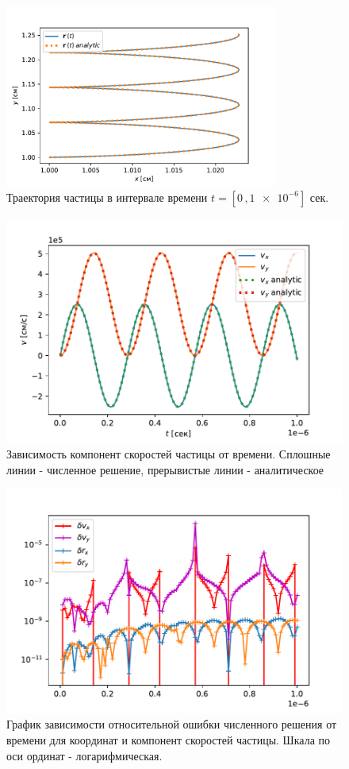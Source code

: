 \documentclass[a4paper]{article}
\begin{document}
\begin{figure}
	\centering
	\includegraphics[width=0.8\textwidth]{plotTrajectory.pdf}
	\caption{Траектория частицы в интервале времени $t = [0 \,, \num{1e-6}]$ сек.}
	\label{graph_t}
\end{figure}

\begin{figure}
	\centering
	\includegraphics[width=0.8\linewidth]{plotSpeed.pdf}
	\caption{Зависимость компонент скоростей частицы от времени. Сплошные линии - численное решение, прерывистые линии - аналитическое}
	\label{graph_s}
\end{figure}

\begin{figure}
	\centering
	\includegraphics[width=0.8\linewidth]{plotMistake.pdf}
	\caption{График зависимости относительной ошибки численного решения от времени для координат и компонент скоростей частицы. Шкала по оси ординат - логарифмическая.}
	\label{graph_m}
\end{figure}
\end{document}
